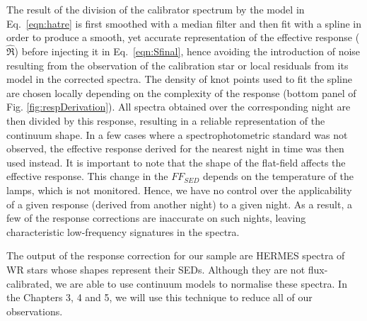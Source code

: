 The result of the division of the calibrator spectrum by the model in Eq.~\ref{eqn:hatre} is first smoothed with a median filter and then fit with a spline in order to produce a smooth, yet accurate representation of the effective response ($\hat{\Re}$) before injecting it in Eq.~\ref{eqn:Sfinal}, hence avoiding the introduction of noise resulting from the observation of the calibration star or local residuals from its model in the corrected spectra. The density of knot points used to fit the spline are chosen locally depending on the complexity of the response (bottom panel of Fig. \ref{fig:respDerivation}). All spectra obtained over the corresponding night are then divided by this response, resulting in a reliable representation of the continuum shape. 
In a few cases where a spectrophotometric standard was not observed, the effective response derived for the nearest night in time was then used instead. It is important to note that the shape of the flat-field affects the effective response. This change in the $FF_{SED}$ depends on the temperature of the lamps, which is not monitored. Hence, we have no control over the applicability of a given response (derived from another night) to a given night. As a result, a few of the response corrections are inaccurate on such nights, leaving characteristic low-frequency signatures in the spectra. 

The output of the response correction for our sample are HERMES spectra of WR stars whose shapes represent their SEDs. Although they are not flux-calibrated, we are able to use continuum models to normalise these spectra. In the Chapters 3, 4 and 5, we will use this technique to reduce all of our observations. 






